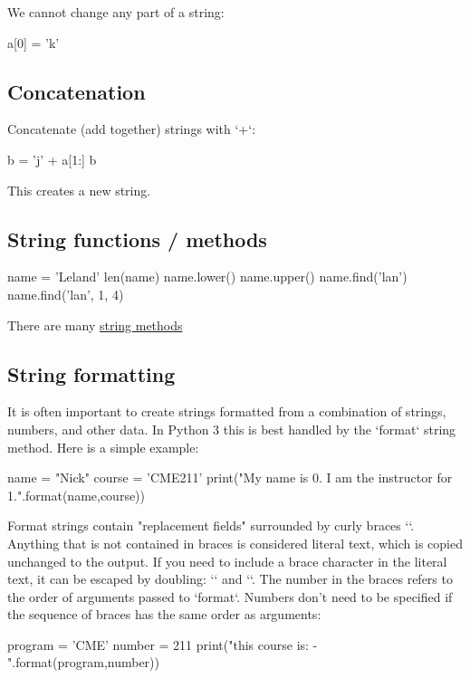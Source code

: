 \documentclass[12pt]{article} \newif\ifsolution\solutiontrue %
\begin{document}
We cannot change any part of a string:

\begin{python}
a[0] = 'k'
\end{python}

\subsection{Concatenation}
Concatenate (add together) strings with `+`:

\begin{python}
b = 'j' + a[1:]
b
\end{python}
This creates a new string.

\subsection{String functions / methods} 	
\begin{python}
name = 'Leland'
len(name)
name.lower()
name.upper()
name.find('lan')
name.find('lan', 1, 4)
\end{python}
There are many \href{https://docs.python.org/3/library/stdtypes.html#string-methods}{string methods}

\subsection{String formatting}

It is often important to create strings formatted from a combination of strings,
numbers, and other data.  In Python 3 this is best handled by the `format`
string method.  Here is a simple example:

\begin{python}
name = "Nick"
course = 'CME211'
print("My name is {0}. I am the instructor for {1}.".format(name,course))
\end{python}

Format strings contain "replacement fields" surrounded by curly braces `{}`.
Anything that is not contained in braces is considered literal text, which is
copied unchanged to the output. If you need to include a brace character in the
literal text, it can be escaped by doubling: `{{` and `}}`.  The number in the
braces refers to the order of arguments passed to `format`.  Numbers don't need
to be specified if the sequence of braces has the same order as arguments:

\begin{python}
program = 'CME'
number = 211
print("this course is: {}-{}".format(program,number))
\end{python}
\end{document}

